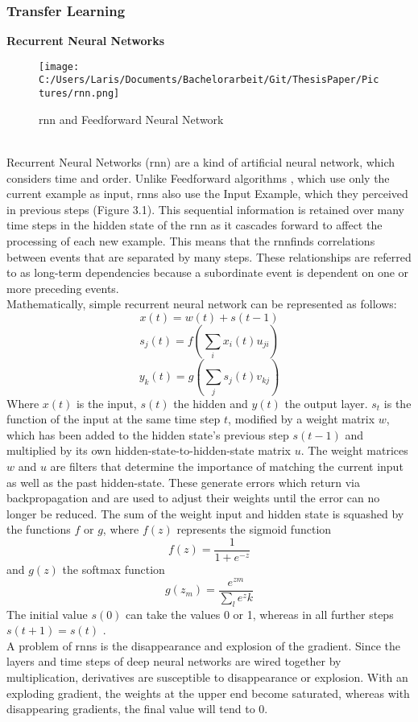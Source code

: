 \documentclass[a4paper, 11pt,titlepage,oneside,openany]{book}
\begin{document}
\subsubsection{Transfer Learning}
\textbf{Recurrent Neural Networks}
\begin{figure}[h]
	\centering
	\texttt{[image: C:/Users/Laris/Documents/Bachelorarbeit/Git/ThesisPaper/Pictures/rnn.png]}
	\caption{\gls{rnn} and Feedforward Neural Network \cite{rnn}}
\end{figure}\\
Recurrent Neural Networks (\gls{rnn}) are a kind of artificial neural network, which considers time and order. Unlike Feedforward algorithms \cite{feedforward}, which use only the current example as input, \gls{rnn}s also use the Input Example, which they perceived in previous steps (Figure 3.1). 
This sequential information is retained over many time steps in the hidden state of the \gls{rnn} as it cascades forward to affect the processing of each new example. This means that the \gls{rnn}finds correlations between events that are separated by many steps. These relationships are referred to as long-term dependencies because a subordinate event is dependent on one or more preceding events.\\
\newpage
\noindent Mathematically, simple recurrent neural network \cite{ELMAN1990179} can be represented as follows:
\[
x(t)=w(t)+s(t-1)
\]
\[
s_j(t)=f(\sum_{i}x_i(t)u_{ji})
\]
\[
y_k(t)=g(\sum_{j}s_j(t)v_{kj})
\]
Where $x(t)$ is the input, $s(t)$ the hidden and $y(t)$ the output layer. $s_t$ is the function of the input at the same time step $t$, modified by a weight matrix $w$, which has been added to the hidden state's previous step $s(t-1)$ and multiplied by its own hidden-state-to-hidden-state matrix $u$. The weight matrices $w$ and $u$ are filters that determine the importance of matching the current input as well as the past hidden-state. These generate errors which return via backpropagation and are used to adjust their weights until the error can no longer be reduced. The sum of the weight input and hidden state is squashed by the functions $f$ or $g$, where  $f(z)$ represents the sigmoid function
\[
f(z)=\frac{1}{1+e^{-z}}
\]
and $g(z)$ the softmax function
\[
g(z_m)=\frac{e^{zm}}{\sum_{l}e^zk}
\]
The initial value $s(0)$ can take the values 0 or 1, whereas in all further steps $s(t+1)=s(t)$ \cite{rnnmodel}. \\
\noindent A problem of \gls{rnn}s is the disappearance and explosion of the gradient. Since the layers and time steps of deep neural networks are wired together by multiplication, derivatives are susceptible to disappearance or explosion. With an exploding gradient, the weights at the upper end become saturated, whereas with disappearing gradients, the final value will tend to 0. \\
\end{document}
